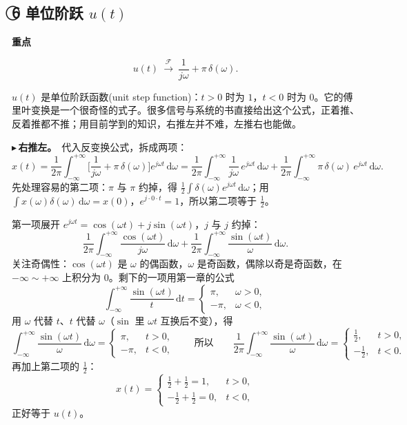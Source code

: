 \documentclass[UTF8,a4paper,11pt]{ctexart}
\newcommand{\dd}{\mathrm{d}}
\newcommand{\F}{\mathcal{F}}
\newenvironment{remember}{\begin{rememberbox}\textbf{重点}\par\smallskip}{\end{rememberbox}}
\newcounter{ex}[section]
\newcommand{\point}[1]{\par\addvspace{1ex}\noindent\textcolor{ptteal}{$\blacktriangleright$\,\textbf{#1}}\ }
\begin{document}
\subsection{\texorpdfstring{\textcircled{\scriptsize 6} 单位阶跃 $u(t)$}{⑥ 单位阶跃 u(t)}}\label{sub:step}
\begin{remember}
\[
u(t)\ \xrightarrow{\ \F\ }\ \frac1{j\omega}+\pi\,\delta(\omega).
\]
\end{remember}
$u(t)$ 是单位阶跃函数(unit step function)：$t>0$ 时为 $1$，$t<0$ 时为 $0$。它的傅里叶变换是一个很奇怪的式子。很多信号与系统的书直接给出这个公式，正着推、反着推都不推；用目前学到的知识，右推左并不难，左推右也能做。

\point{右推左。}代入反变换公式，拆成两项：
\[
x(t)=\frac1{2\pi}\int_{-\infty}^{+\infty}\Big[\frac1{j\omega}+\pi\,\delta(\omega)\Big]e^{j\omega t}\,\dd\omega
=\frac1{2\pi}\int_{-\infty}^{+\infty}\frac1{j\omega}\,e^{j\omega t}\,\dd\omega
+\frac1{2\pi}\int_{-\infty}^{+\infty}\pi\,\delta(\omega)\,e^{j\omega t}\,\dd\omega .
\]
先处理容易的第二项：$\pi$ 与 $\pi$ 约掉，得 $\frac12\int\delta(\omega)e^{j\omega t}\,\dd\omega$；用 $\int x(\omega)\delta(\omega)\,\dd\omega=x(0)$，$e^{j\cdot0\cdot t}=1$，所以第二项等于 $\frac12$。

第一项展开 $e^{j\omega t}=\cos(\omega t)+j\sin(\omega t)$，$j$ 与 $j$ 约掉：
\[
\frac1{2\pi}\int_{-\infty}^{+\infty}\frac{\cos(\omega t)}{j\omega}\,\dd\omega+\frac1{2\pi}\int_{-\infty}^{+\infty}\frac{\sin(\omega t)}{\omega}\,\dd\omega .
\]
关注奇偶性：$\cos(\omega t)$ 是 $\omega$ 的偶函数，$\omega$ 是奇函数，偶除以奇是奇函数，在 $-\infty\sim+\infty$ 上积分为 $0$。剩下的一项用第一章的公式
\[
\int_{-\infty}^{+\infty}\frac{\sin(\omega t)}{t}\,\dd t=\begin{cases}\pi, & \omega>0,\\ -\pi, & \omega<0,\end{cases}
\]
用 $\omega$ 代替 $t$、$t$ 代替 $\omega$（$\sin$ 里 $\omega t$ 互换后不变），得
\[
\int_{-\infty}^{+\infty}\frac{\sin(\omega t)}{\omega}\,\dd\omega=\begin{cases}\pi, & t>0,\\ -\pi, & t<0,\end{cases}
\qquad\text{所以}\qquad
\frac1{2\pi}\int_{-\infty}^{+\infty}\frac{\sin(\omega t)}{\omega}\,\dd\omega=\begin{cases}\frac12, & t>0,\\ -\frac12, & t<0 .\end{cases}
\]
再加上第二项的 $\frac12$：
\[
x(t)=\begin{cases}\frac12+\frac12=1, & t>0,\\[2pt] -\frac12+\frac12=0, & t<0,\end{cases}
\]
正好等于 $u(t)$。
\end{document}
